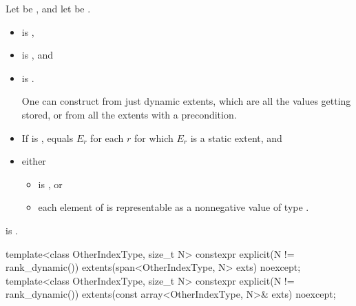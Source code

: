 \begin{itemdescr}
\pnum
Let  be ,
and let  be
.

\pnum
\constraints
\begin{itemize}
\item
{} is ,
\item
{} is , and
\item
{} is .
\begin{note}
One can construct  from just dynamic extents,
which are all the values getting stored, or
from all the extents with a precondition.
\end{note}
\end{itemize}

\pnum
\expects
\begin{itemize}
\item
If  is ,
 equals $E_r$
for each $r$ for which $E_r$ is a static extent, and
\item
either
\begin{itemize}
\item
{} is , or
\item
each element of  is representable
as a nonnegative value of type .
\end{itemize}
\end{itemize}

\pnum
\ensures
{} is .
\end{itemdescr}

%
\begin{itemdecl}
template<class OtherIndexType, size_t N>
  constexpr explicit(N != rank_dynamic())
    extents(span<OtherIndexType, N> exts) noexcept;
template<class OtherIndexType, size_t N>
  constexpr explicit(N != rank_dynamic())
    extents(const array<OtherIndexType, N>& exts) noexcept;
\end{itemdecl}

